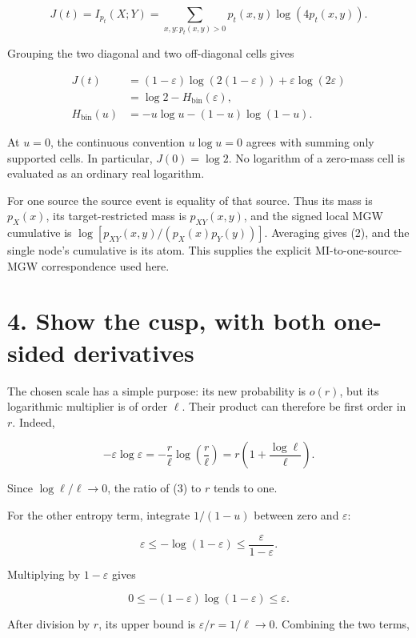 \documentclass[11pt,a4paper]{article}
\begin{document}
\[
J(t)=I_{p_t}(X;Y)
=\sum_{x,y:p_t(x,y)>0}p_t(x,y)\log(4p_t(x,y)).
\]

Grouping the two diagonal and two off-diagonal cells gives

\[
\begin{aligned}
J(t)
&=(1-\varepsilon)\log(2(1-\varepsilon))
  +\varepsilon\log(2\varepsilon)\\
&=\log2-H_{\mathrm{bin}}(\varepsilon), \\
H_{\mathrm{bin}}(u)
&=-u\log u-(1-u)\log(1-u).
\end{aligned} \tag{2}
\]

At \(u=0\), the continuous convention \(u\log u=0\) agrees with summing only supported cells. In particular, \(J(0)=\log2\). No logarithm of a zero-mass cell is evaluated as an ordinary real logarithm.

For one source the source event is equality of that source. Thus its mass is \(p_X(x)\), its target-restricted mass is \(p_{XY}(x,y)\), and the signed local MGW cumulative is \(\log[p_{XY}(x,y)/(p_X(x)p_Y(y))]\). Averaging gives (2), and the single node's cumulative is its atom. This supplies the explicit MI-to-one-source-MGW correspondence used here.

\section{4. Show the cusp, with both one-sided derivatives}\label{show-the-cusp-with-both-one-sided-derivatives}

The chosen scale has a simple purpose: its new probability is \(o(r)\), but its logarithmic multiplier is of order \(\ell\). Their product can therefore be first order in \(r\). Indeed,

\[
-\varepsilon\log\varepsilon
=-\frac r\ell\log\!\left(\frac r\ell\right)
=r\left(1+\frac{\log\ell}{\ell}\right). \tag{3}
\]

Since \(\log\ell/\ell\to0\), the ratio of (3) to \(r\) tends to one.

For the other entropy term, integrate \(1/(1-u)\) between zero and \(\varepsilon\):

\[
\varepsilon\le-\log(1-\varepsilon)
\le\frac{\varepsilon}{1-\varepsilon}.
\]

Multiplying by \(1-\varepsilon\) gives

\[
0\le-(1-\varepsilon)\log(1-\varepsilon)\le\varepsilon.
\]

After division by \(r\), its upper bound is \(\varepsilon/r=1/\ell\to0\). Combining the two terms,
\end{document}
